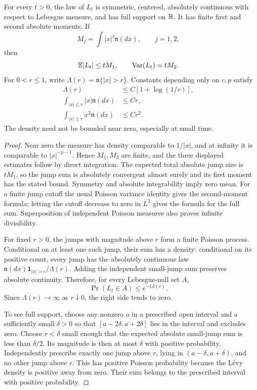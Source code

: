\begin{lemma}
\label{lem:levy-scalar-properties}
For every $t>0$, the law of $L_t$ is symmetric, centered, absolutely continuous with respect to Lebesgue measure, and has full support on $\mathbb R$. It has finite first and second absolute moments. If
\[
 M_j=\int |x|^j\mathfrak n(dx),\qquad j=1,2,
\]
then
\[
 \mathbb E|L_t|\le tM_1,\qquad \operatorname{Var}(L_t)=tM_2.
\]
For $0<r\le1$, write $\Lambda(r)=\mathfrak n\{|x|>r\}$. Constants depending only on $c,p$ satisfy
\begin{align*}
 \Lambda(r)&\le C[1+\log(1/r)],\\
 \int_{|x|\le r}|x|\mathfrak n(dx)&\le Cr,\\
 \int_{|x|\le r}x^2\mathfrak n(dx)&\le Cr^2.
\end{align*}
The density need not be bounded near zero, especially at small time.
\end{lemma}
\begin{proof}
Near zero the measure has density comparable to $1/|x|$, and at infinity it is comparable to $|x|^{-p-1}$. Hence $M_1,M_2$ are finite, and the three displayed estimates follow by direct integration. The expected total absolute jump size is $tM_1$, so the jump sum is absolutely convergent almost surely and its first moment has the stated bound. Symmetry and absolute integrability imply zero mean. For a finite jump cutoff the usual Poisson variance identity gives the second-moment formula; letting the cutoff decrease to zero in $L^2$ gives the formula for the full sum. Superposition of independent Poisson measures also proves infinite divisibility.

For fixed $r>0$, the jumps with magnitude above $r$ form a finite Poisson process. Conditional on at least one such jump, their sum has a density: conditional on its positive count, every jump has the absolutely continuous law $\mathfrak n(dx)\mathbf1_{|x|>r}/\Lambda(r)$. Adding the independent small-jump sum preserves absolute continuity. Therefore, for every Lebesgue-null set $A$,
\[
 \Pr(L_t\in A)\le e^{-t\Lambda(r)}.
\]
Since $\Lambda(r)\to\infty$ as $r\downarrow0$, the right side tends to zero.

To see full support, choose any nonzero $a$ in a prescribed open interval and a sufficiently small $\delta>0$ so that $[a-2\delta,a+2\delta]$ lies in the interval and excludes zero. Choose $r<\delta$ small enough that the expected absolute small-jump sum is less than $\delta/2$. Its magnitude is then at most $\delta$ with positive probability. Independently prescribe exactly one jump above $r$, lying in $(a-\delta,a+\delta)$, and no other jump above $r$. This has positive Poisson probability because the L\'evy density is positive away from zero. Their sum belongs to the prescribed interval with positive probability.
\end{proof}


